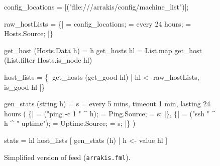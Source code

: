 



\begin{figure}
\begin{code}
 config_locations =
  [("file:///arrakis/config/machine_list")];

 raw_hostLists =  
   \{|
     =  config_locations;
    = every 24 hours; 
      = Hosts.Source;   |\}

 get_host (Hosts.Data h) = h
 get_hosts hl =
    List.map get_host 
     (List.filter Hosts.is_node hl)

 host_lists = 
  \{| get_hosts (get_good hl) | 
     hl <- raw_hostLists, is_good hl |\}

 gen_stats (string h) = 
   s = every 5 mins, 
          timeout 1 min, 
          lasting 24 hours 
  (
    \{| 
       =  ("ping -c 1 " ^ h);   
        = Ping.Source;  
      = s; |\},
    \{| 
       =  ("ssh " ^ h ^ " uptime");  
        = Uptime.Source;  
      = s; |\}
  )

 stats =
   hl  host_lists 
     [ gen_stats (h) | h <- value hl ]
\end{code}
\caption{Simplified version of \vizGems{} feed (\texttt{arrakis.fml}).}
\label{fig:pulse2}
\shrink
\end{figure}
